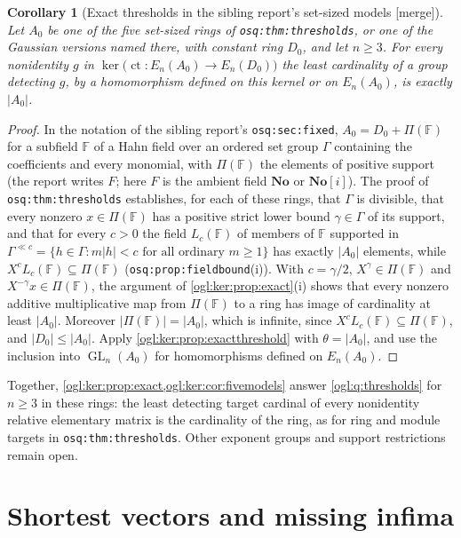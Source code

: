 \documentclass[11pt,oneside]{article}
\numberwithin{equation}{section}
\newtheorem{corollary}[corollary]{Corollary}
\theoremstyle{definition}
\theoremstyle{remark}
\newcommand{\No}{\mathbf{No}}
\newcommand{\SC}{\No[i]}
\newcommand{\ct}{\operatorname{ct}}
\newcommand{\GL}{\operatorname{GL}}
\newcommand{\mergetag}{\textup{\textsf{\small[merge]}}}
\newcommand{\replabel}[1]{\nolinkurl{#1}}
\begin{document}
\begin{corollary}[Exact thresholds in the sibling report's set-sized models \mergetag]\label{ogl:ker:cor:fivemodels}
Let $A_0$ be one of the five set-sized rings of \replabel{osq:thm:thresholds}, or
one of the Gaussian versions named there, with constant ring $D_0$, and let
$n\ge3$. For every nonidentity $g$ in $\ker\bigl(\ct:E_n(A_0)\to E_n(D_0)\bigr)$
the least cardinality of a group detecting $g$, by a homomorphism defined on this
kernel or on $E_n(A_0)$, is exactly $|A_0|$.
\end{corollary}
\begin{proof}
In the notation of the sibling report's \replabel{osq:sec:fixed},
$A_0=D_0+\Pi(\mathbb F)$ for a subfield $\mathbb F$ of a Hahn field over an
ordered set group $\Gamma$ containing the coefficients and every monomial, with
$\Pi(\mathbb F)$ the elements of positive support (the report writes $F$; here
$F$ is the ambient field $\No$ or $\SC$). The proof of
\replabel{osq:thm:thresholds} establishes, for each of these rings, that
$\Gamma$ is divisible, that every nonzero $x\in\Pi(\mathbb F)$ has a positive
strict lower bound $\gamma\in\Gamma$ of its support, and that for every $c>0$ the
field $L_c(\mathbb F)$ of members of $\mathbb F$ supported in
$\Gamma^{\ll c}=\{h\in\Gamma:m|h|<c\text{ for all ordinary }m\ge1\}$ has exactly $|A_0|$ elements, while $X^cL_c(\mathbb F)\subseteq\Pi(\mathbb F)$
(\replabel{osq:prop:fieldbound}(i)). With $c=\gamma/2$,
$X^\gamma\in\Pi(\mathbb F)$ and $X^{-\gamma}x\in\Pi(\mathbb F)$, the argument of \cref{ogl:ker:prop:exact}(i) shows
that every nonzero additive multiplicative map from $\Pi(\mathbb F)$ to a ring
has image of cardinality at least $|A_0|$. Moreover
$|\Pi(\mathbb F)|=|A_0|$, which is infinite, since
$X^cL_c(\mathbb F)\subseteq\Pi(\mathbb F)$, and $|D_0|\le|A_0|$. Apply
\cref{ogl:ker:prop:exactthreshold} with $\theta=|A_0|$, and use the inclusion into
$\GL_n(A_0)$ for homomorphisms defined on $E_n(A_0)$.
\end{proof}

Together, \cref{ogl:ker:prop:exact,ogl:ker:cor:fivemodels} answer
\cref{ogl:q:thresholds} for $n\ge3$ in these rings: the least detecting target
cardinal of every nonidentity relative elementary matrix is the cardinality of
the ring, as for ring and module targets in \replabel{osq:thm:thresholds}. Other
exponent groups and support restrictions remain open.
\part{Shortest vectors and missing infima}\label{ogl:lat:part}
\end{document}
